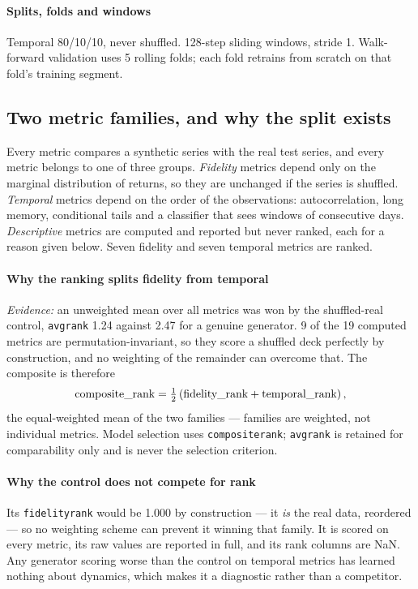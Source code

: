 \documentclass[11pt,a4paper]{article}
\makeatletter
\DeclareRobustCommand{\_}{\ifmmode\nfss@text{\textunderscore}\else\textunderscore\allowbreak\fi}
\makeatother
\begin{document}
\paragraph{Splits, folds and windows} Temporal 80/10/10, never shuffled. 128-step sliding windows, stride 1. Walk-forward validation uses 5 rolling folds; each fold retrains from scratch on that fold's training segment.

\subsection{Two metric families, and why the split exists}
\label{sec:families}
Every metric compares a synthetic series with the real test series, and every metric belongs to one of three groups. \emph{Fidelity} metrics depend only on the marginal distribution of returns, so they are unchanged if the series is shuffled. \emph{Temporal} metrics depend on the order of the observations: autocorrelation, long memory, conditional tails and a classifier that sees windows of consecutive days. \emph{Descriptive} metrics are computed and reported but never ranked, each for a reason given below. Seven fidelity and seven temporal metrics are ranked.

\paragraph{Why the ranking splits fidelity from temporal} \textit{Evidence:} an unweighted mean over all metrics was won by the shuffled-real control, \texttt{avg\_rank} 1.24 against 2.47 for a genuine generator. 9 of the 19 computed metrics are permutation-invariant, so they score a shuffled deck perfectly by construction, and no weighting of the remainder can overcome that. The composite is therefore
\[ \text{composite\_rank} = \tfrac{1}{2}\left(\text{fidelity\_rank} + \text{temporal\_rank}\right), \]
the equal-weighted mean of the two families --- families are weighted, not individual metrics. Model selection uses \texttt{composite\_rank}; \texttt{avg\_rank} is retained for comparability only and is never the selection criterion.

\paragraph{Why the control does not compete for rank} Its \texttt{fidelity\_rank} would be 1.000 by construction --- it \emph{is} the real data, reordered --- so no weighting scheme can prevent it winning that family. It is scored on every metric, its raw values are reported in full, and its rank columns are NaN. Any generator scoring worse than the control on temporal metrics has learned nothing about dynamics, which makes it a diagnostic rather than a competitor.
\end{document}
